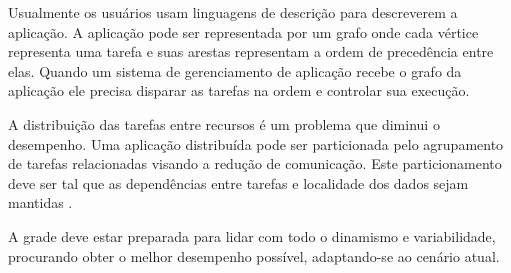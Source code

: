 Usualmente os usuários usam linguagens de descrição para descreverem a aplicação. A aplicação pode ser representada por um grafo onde cada vértice representa uma tarefa e suas arestas representam a ordem de precedência entre elas. Quando um sistema de gerenciamento de aplicação recebe o grafo da aplicação ele precisa disparar as tarefas na ordem e controlar sua execução. 

A distribuição das tarefas entre recursos é um problema que diminui o desempenho. Uma aplicação distribuída pode ser particionada pelo agrupamento de tarefas relacionadas visando a redução de comunicação. Este particionamento deve ser tal que as dependências entre tarefas e localidade dos dados sejam mantidas \cite{Mangan2006}. 

A grade deve estar preparada para lidar com todo o dinamismo e variabilidade, procurando obter o melhor desempenho possível, adaptando-se ao cenário atual.

